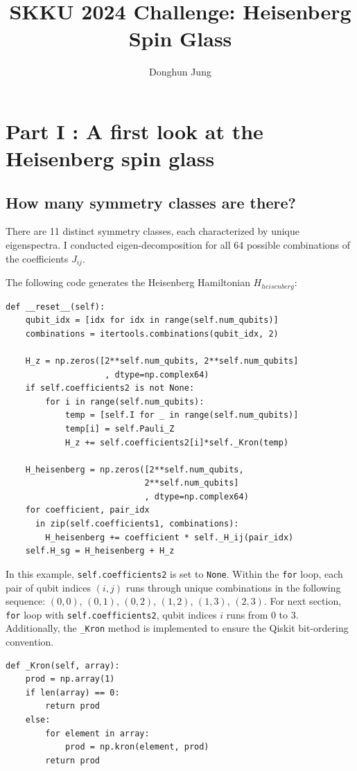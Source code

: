 \documentclass[a4paper, 11pt]{article}
\begin{document}
\title{SKKU 2024 Challenge: Heisenberg Spin Glass}
\author{Donghun Jung}
\maketitle

\section*{Part I : A first look at the Heisenberg spin glass}

\subsection*{How many symmetry classes are there?}
There are 11 distinct symmetry classes, each characterized by unique eigenspectra. 
I conducted eigen-decomposition for all 64 possible combinations of the coefficients $J_{ij}$. 

The following code generates the Heisenberg Hamiltonian $H_{heisenberg}$:
\begin{verbatim}
def __reset__(self):
    qubit_idx = [idx for idx in range(self.num_qubits)]
    combinations = itertools.combinations(qubit_idx, 2)
    
    H_z = np.zeros([2**self.num_qubits, 2**self.num_qubits]
                    , dtype=np.complex64)
    if self.coefficients2 is not None:
        for i in range(self.num_qubits):
            temp = [self.I for _ in range(self.num_qubits)]
            temp[i] = self.Pauli_Z
            H_z += self.coefficients2[i]*self._Kron(temp)
    
    H_heisenberg = np.zeros([2**self.num_qubits, 
                            2**self.num_qubits]
                            , dtype=np.complex64)
    for coefficient, pair_idx 
      in zip(self.coefficients1, combinations):
        H_heisenberg += coefficient * self._H_ij(pair_idx)
    self.H_sg = H_heisenberg + H_z
\end{verbatim}

In this example, \texttt{self.coefficients2} is set to \texttt{None}. 
Within the \texttt{for} loop, each pair of qubit indices $(i,j)$ runs through unique combinations in the following sequence: 
$(0,0)$, $(0,1)$, $(0,2)$, $(1,2)$, $(1,3)$, $(2,3)$.
For next section, \texttt{for} loop with \texttt{self.coefficients2}, qubit indices $i$ runs from 0 to 3.
Additionally, the \texttt{\_Kron} method is implemented to ensure the Qiskit bit-ordering convention.
\begin{verbatim}
def _Kron(self, array):
    prod = np.array(1)
    if len(array) == 0:
        return prod
    else:
        for element in array:
            prod = np.kron(element, prod) 
        return prod
\end{verbatim}
\end{document}
